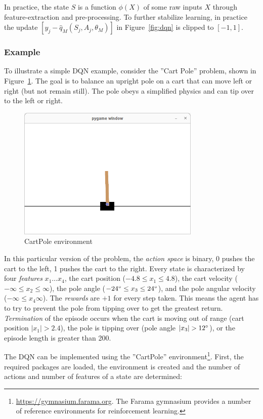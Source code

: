 In practice, the state $S$ is a function $\phi(X)$ of some raw inputs $X$ through feature-extraction and pre-processing. To further stabilize learning, in practice the update $[y_j - \hat{q}_M (S_j, A_j, \theta_M)]$ in Figure~\ref{fig:dqn} is clipped to $[-1, 1]$.

\subsubsection*{Example}

To illustrate a simple DQN example, consider the ''Cart Pole'' problem, shown in Figure~\ref{fig:screen1_chap22}. The goal is to balance an upright pole on a cart that can move left or right (but not remain still). The pole obeys a simplified physics and can tip over to the left or right.

\begin{figure}
\centering
\includegraphics[height=2.5in]{screen1.png}
\caption{CartPole environment}
\label{fig:screen1_chap22}
\end{figure}

In this particular version of the problem, the \emph{action space} is binary, 0 pushes the cart to the left, 1 pushes the cart to the right. Every state is characterized by four \emph{features} $x_1 \ldots x_4$, the cart position ($-4.8 \leq x_1 \leq 4.8$), the cart velocity ($-\infty \leq x_2 \leq \infty$), the pole angle ($-24\degree \leq x_3 \leq 24\degree$), and the pole angular velocity ($-\infty \leq x_4 \infty$). The \emph{rewards} are $+1$ for every step taken. This means the agent has to try to prevent the pole from tipping over to get the greatest return. \emph{Termination} of the episode occurs when the cart is moving out of range (cart position $|x_1| > 2.4$), the pole is tipping over (pole angle $|x_3| > 12\degree$), or the episode length is greater than 200.

The DQN can be implemented using the ''CartPole'' environment\footnote{\url{https://gymnasium.farama.org}. The Farama gymnasium provides a number of reference environments for reinforcement learning.}. First, the required packages are loaded, the environment is created and the number of actions and number of features of a state are determined:

